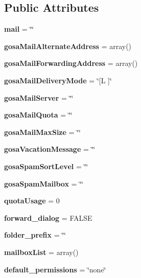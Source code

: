 \subsection*{Public Attributes}
\begin{CompactItemize}
\item 
{\bf mail} = \char`\"{}\char`\"{}\label{classmailAccount_o0}

\item 
{\bf gosa\-Mail\-Alternate\-Address} = array()\label{classmailAccount_o1}

\item 
{\bf gosa\-Mail\-Forwarding\-Address} = array()\label{classmailAccount_o2}

\item 
{\bf gosa\-Mail\-Delivery\-Mode} = \char`\"{}[L ]\char`\"{}\label{classmailAccount_o3}

\item 
{\bf gosa\-Mail\-Server} = \char`\"{}\char`\"{}\label{classmailAccount_o4}

\item 
{\bf gosa\-Mail\-Quota} = \char`\"{}\char`\"{}\label{classmailAccount_o5}

\item 
{\bf gosa\-Mail\-Max\-Size} = \char`\"{}\char`\"{}\label{classmailAccount_o6}

\item 
{\bf gosa\-Vacation\-Message} = \char`\"{}\char`\"{}\label{classmailAccount_o7}

\item 
{\bf gosa\-Spam\-Sort\-Level} = \char`\"{}\char`\"{}\label{classmailAccount_o8}

\item 
{\bf gosa\-Spam\-Mailbox} = \char`\"{}\char`\"{}\label{classmailAccount_o9}

\item 
{\bf quota\-Usage} = 0\label{classmailAccount_o10}

\item 
{\bf forward\_\-dialog} = FALSE\label{classmailAccount_o11}

\item 
{\bf folder\_\-prefix} = \char`\"{}\char`\"{}\label{classmailAccount_o12}

\item 
{\bf mailbox\-List} = array()\label{classmailAccount_o13}

\item 
{\bf default\_\-permissions} = \char`\"{}none\char`\"{}\label{classmailAccount_o14}


\end{CompactItemize}
